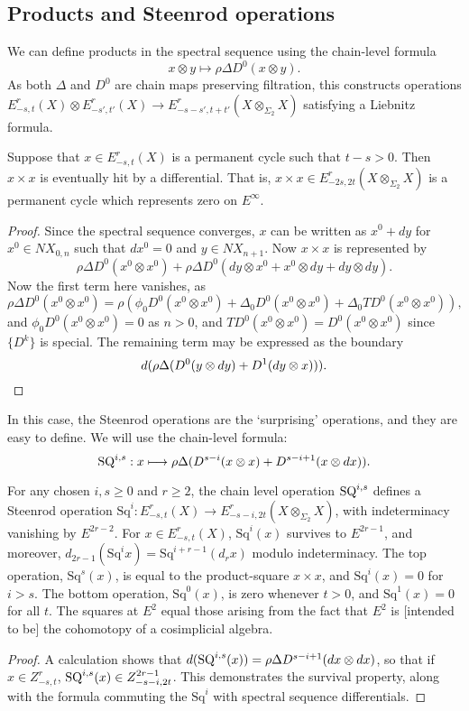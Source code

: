 \documentclass[10pt]{article}
\newcommand{\Sq}{\mathrm{Sq}}
\begin{document}
\begin{AdamsSSEQ operations final}
\subsection{Products and Steenrod operations}
We can define products in the spectral sequence using the chain-level formula
\[x\otimes y\mapsto\rho\Delta D^0(x\otimes y).\]
As both $\Delta$ and $D^0$ are chain maps preserving filtration, this constructs operations $E^r_{-s,t}(X)\otimes E^r_{-s',t'}(X)\to E^r_{-s-s',t+t'}(X\otimes_{\Sigma_2}X)$ satisfying a Liebnitz formula.
\begin{prop}
Suppose that $x\in E^r_{-s,t}(X)$ is a permanent cycle such that $t-s>0$. Then $x\times x$ is eventually hit by a differential. That is, $x\times x\in E^r_{-2s,2t}(X\otimes_{\Sigma_2}X)$ is a permanent cycle which represents zero on $E^\infty$.
\end{prop}
\begin{proof}
Since the spectral sequence converges, $x$ can be written as $x^0+dy$ for $x^0\in NX_{0,n}$ such that $dx^0=0$ and $y\in NX_{n+1}$. Now $x\times x$ is represented by
\[\rho\Delta D^0(x^0\otimes x^0)+\rho\Delta D^0(dy\otimes x^0+x^0\otimes dy+dy\otimes dy).\]
Now the first term here vanishes, as
\[\rho\Delta D^0(x^0\otimes x^0)=\rho(\phi_0 D^0(x^0\otimes x^0)+\Delta_0 D^0(x^0\otimes x^0)+\Delta_0 TD^0(x^0\otimes x^0)),\]
and $\phi_0D^0(x^0\otimes x^0)=0$ as $n>0$, and $TD^0(x^0\otimes x^0)=D^0(x^0\otimes x^0)$ since $\{D^k\}$ is special. The remaining term may be expressed as the boundary
\[d(\rho\Delta(D^0(y\otimes dy)+D^1(dy\otimes x))).\qedhere\]
\end{proof}

In this case, the Steenrod operations are the `surprising' operations, and they are easy to define. We will use the chain-level formula:
\[\textup{SQ}^{i,s}:x\mapsto \rho\Delta (D^{s-i}(x\otimes x)+D^{s-i+1}(x\otimes dx)).\]
\begin{prop}
For any chosen $i,s\geq0$ and $r\geq2$, the chain level operation $\textup{SQ}^{i,s}$ defines a Steenrod operation $\Sq^i:E^r_{-s,t}(X)\to E^r_{-s-i,2t}(X\otimes_{\Sigma_2}X)$, with indeterminacy vanishing by $E^{2r-2}$. For $x\in E^r_{-s,t}(X)$, $\Sq^i(x)$ survives to $E^{2r-1}$, and moreover, $d_{2r-1}(\Sq^ix)=\Sq^{i+r-1}(d_rx)$ modulo indeterminacy. The top operation, $\Sq^s(x)$, is equal to the product-square $x\times x$, and $\Sq^i(x)=0$ for $i>s$. The bottom operation, $\Sq^0(x)$, is zero whenever $t>0$, and $\Sq^1(x)=0$ for all $t$. The squares at $E^2$ equal those arising from the fact that $E^2$ is [intended to be] the cohomotopy of a cosimplicial algebra.
\end{prop}
\begin{proof}
A calculation shows that $d(\textup{SQ}^{i,s}(x))=\rho\Delta D^{s-i+1}(dx\otimes dx)$, so that if $x\in Z^r_{-s,t}$, $\textup{SQ}^{i,s}(x)\in Z^{2r-1}_{-s-i,2t}$. This demonstrates the survival property, along with the formula commuting the $\Sq^i$ with spectral sequence differentials.


\end{proof}
\end{AdamsSSEQ operations final}
\end{document}
